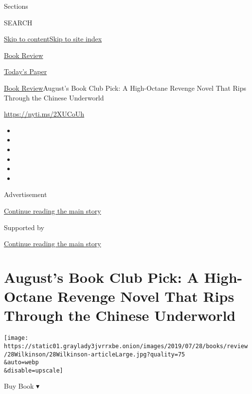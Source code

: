 Sections

SEARCH

\protect\hyperlink{site-content}{Skip to
content}\protect\hyperlink{site-index}{Skip to site index}

\href{https://www.nytimes3xbfgragh.onion/section/books/review}{Book
Review}

\href{https://myaccount.nytimes3xbfgragh.onion/auth/login?response_type=cookie\&client_id=vi}{}

\href{https://www.nytimes3xbfgragh.onion/section/todayspaper}{Today's
Paper}

\href{/section/books/review}{Book Review}\textbar{}August's Book Club
Pick: A High-Octane Revenge Novel That Rips Through the Chinese
Underworld

\url{https://nyti.ms/2XUCoUh}

\begin{itemize}
\item
\item
\item
\item
\item
\item
\end{itemize}

Advertisement

\protect\hyperlink{after-top}{Continue reading the main story}

Supported by

\protect\hyperlink{after-sponsor}{Continue reading the main story}

\hypertarget{augusts-book-club-pick-a-high-octane-revenge-novel-that-rips-through-the-chinese-underworld}{%
\section{August's Book Club Pick: A High-Octane Revenge Novel That Rips
Through the Chinese
Underworld}\label{augusts-book-club-pick-a-high-octane-revenge-novel-that-rips-through-the-chinese-underworld}}

\texttt{[image: https://static01.graylady3jvrrxbe.onion/images/2019/07/28/books/review/28Wilkinson/28Wilkinson-articleLarge.jpg?quality=75\\\&auto=webp\\\&disable=upscale]}

Buy Book ▾

